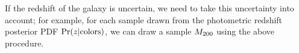 \documentclass[useAMS,usenatbib,a4paper]{mn2e}
\begin{document}
If the redshift of the galaxy is uncertain, we need to take this
uncertainty into account; for example, for each sample drawn from the
photometric redshift posterior PDF $\Pr(z|{\rm colors})$, we can draw a
sample $M_{200}$ using the above procedure.



% 

% 
% 




\label{lastpage}
\bsp
\end{document}
